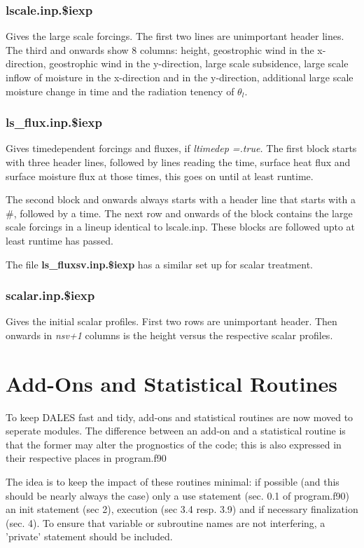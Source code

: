 \documentclass[a4paper,10pt]{article}
\begin{document}
\subsubsection*{lscale.inp.\$iexp}
Gives the large scale forcings. The first two lines are unimportant header lines. The third and onwards show 8 columns: height, geostrophic wind in the x-direction, geostrophic wind in the y-direction, large scale subsidence, large scale inflow of moisture in the x-direction and in the y-direction, additional large scale moisture change in time and the radiation tenency of $\theta_l$.
\subsubsection*{ls\_flux.inp.\$iexp}
Gives timedependent forcings and fluxes, if \textit{ltimedep =.true.} The first block starts with three header lines, followed by lines reading the time, surface heat flux and surface moisture flux at those times, this goes on until at least runtime.

The second block and onwards always starts with a header line that starts with a \#, followed by a time. The next row and onwards of the block contains the large scale forcings in a lineup identical to lscale.inp. These blocks are followed upto at least runtime has passed.

The file \textbf{ls\_fluxsv.inp.\$iexp} has a similar set up for scalar treatment.

\subsubsection*{scalar.inp.\$iexp}
Gives the initial scalar profiles. First two rows are unimportant header. Then onwards in \textit{nsv+1} columns is the height versus the respective scalar profiles.
\section{Add-Ons and Statistical Routines}
\label{addon}
To keep DALES fast and tidy, add-ons and statistical routines are now moved to seperate modules. The difference between an add-on and a statistical routine is that the former may alter the prognostics of the code; this is also expressed in their respective places in program.f90

The idea is to keep the impact of these routines minimal: if possible (and this should be nearly always the case) only a use statement (sec. 0.1 of program.f90) an init statement (sec 2), execution (sec 3.4 resp. 3.9) and if necessary finalization (sec. 4). To ensure that variable or subroutine names are not interfering, a 'private' statement should be included.
\end{document}
